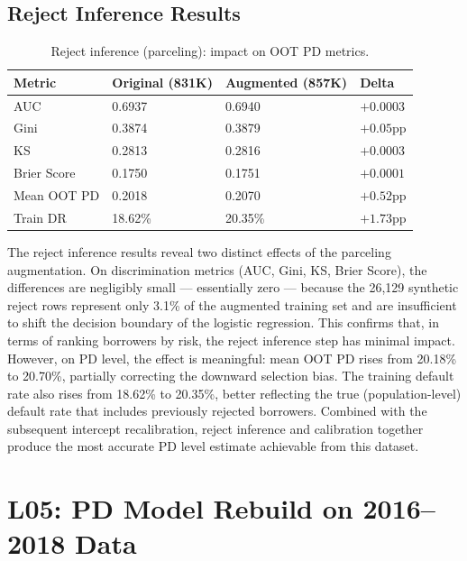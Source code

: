 \documentclass[12pt,a4paper]{report}
\begin{document}
\subsection{Reject Inference Results}

\begin{table}[H]
\centering
\caption{Reject inference (parceling): impact on OOT PD metrics.}
\label{tab:rejectinf}
\begin{tabular}{llll}
\toprule
\textbf{Metric} & \textbf{Original (831K)} & \textbf{Augmented (857K)} & \textbf{Delta} \\
\midrule
AUC         & 0.6937 & 0.6940 & $+0.0003$ \\
Gini        & 0.3874 & 0.3879 & $+0.05$pp \\
KS          & 0.2813 & 0.2816 & $+0.0003$ \\
Brier Score & 0.1750 & 0.1751 & $+0.0001$ \\
Mean OOT PD & 0.2018 & 0.2070 & $+0.52$pp \\
Train DR    & 18.62\% & 20.35\% & $+1.73$pp \\
\bottomrule
\end{tabular}
\end{table}

The reject inference results reveal two distinct effects of the parceling augmentation. On discrimination metrics (AUC, Gini, KS, Brier Score), the differences are negligibly small --- essentially zero --- because the 26,129 synthetic reject rows represent only 3.1\% of the augmented training set and are insufficient to shift the decision boundary of the logistic regression. This confirms that, in terms of ranking borrowers by risk, the reject inference step has minimal impact. However, on PD level, the effect is meaningful: mean OOT PD rises from 20.18\% to 20.70\%, partially correcting the downward selection bias. The training default rate also rises from 18.62\% to 20.35\%, better reflecting the true (population-level) default rate that includes previously rejected borrowers. Combined with the subsequent intercept recalibration, reject inference and calibration together produce the most accurate PD level estimate achievable from this dataset.

\section{L05: PD Model Rebuild on 2016--2018 Data}
\label{sec:l05}
\end{document}
